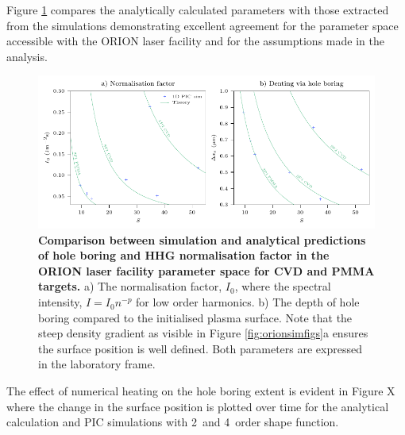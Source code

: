 Figure \ref{fig:orioncombinedi0ds} compares the analytically calculated parameters with those extracted from the simulations demonstrating excellent agreement for the parameter space accessible with the ORION laser facility and for the assumptions made in the analysis.
\begin{figure}
	\centering
	\includegraphics{figures/orion/orion_combined_I0_ds}
	\caption[Comparison between simulation and analytical predictions of hole boring and HHG normalisation factor.]{\textbf{Comparison between simulation and analytical predictions of hole boring and HHG normalisation factor in the ORION laser facility parameter space for CVD and PMMA targets.} a) The normalisation factor, $I_0$, where the spectral intensity, $I = I_0 n^{-p}$ for low order harmonics. b) The depth of hole boring compared to the initialised plasma surface. Note that the steep density gradient as visible in Figure \ref{fig:orionsimfigs}a ensures the surface position is well defined. Both parameters are expressed in the laboratory frame.}
	\label{fig:orioncombinedi0ds}
\end{figure}
The effect of numerical heating on the hole boring extent is evident in Figure X where the change in the surface position is plotted over time for the analytical calculation and PIC simulations with 2\nd\ and 4\th\ order shape function. 
